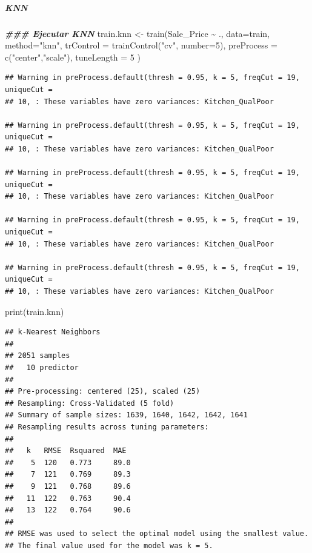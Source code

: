 \documentclass[
]{article}
\newenvironment{Shaded}{\begin{snugshade}}{\end{snugshade}}
\newcommand{\AttributeTok}[1]{\textcolor[rgb]{0.77,0.63,0.00}{#1}}
\newcommand{\DecValTok}[1]{\textcolor[rgb]{0.00,0.00,0.81}{#1}}
\newcommand{\DocumentationTok}[1]{\textcolor[rgb]{0.56,0.35,0.01}{\textbf{\textit{#1}}}}
\newcommand{\FunctionTok}[1]{\textcolor[rgb]{0.00,0.00,0.00}{#1}}
\newcommand{\NormalTok}[1]{#1}
\newcommand{\OtherTok}[1]{\textcolor[rgb]{0.56,0.35,0.01}{#1}}
\newcommand{\SpecialCharTok}[1]{\textcolor[rgb]{0.00,0.00,0.00}{#1}}
\newcommand{\StringTok}[1]{\textcolor[rgb]{0.31,0.60,0.02}{#1}}
\begin{document}
\hypertarget{knn}{%
\subparagraph{KNN}\label{knn}}

\begin{Shaded}
\begin{Highlighting}[]
\DocumentationTok{\#\#\# Ejecutar KNN}
\NormalTok{train.knn }\OtherTok{\textless{}{-}} \FunctionTok{train}\NormalTok{(Sale\_Price }\SpecialCharTok{\textasciitilde{}}\NormalTok{ ., }
                   \AttributeTok{data=}\NormalTok{train, }\AttributeTok{method=}\StringTok{"knn"}\NormalTok{,  }
                   \AttributeTok{trControl =} \FunctionTok{trainControl}\NormalTok{(}\StringTok{"cv"}\NormalTok{, }\AttributeTok{number=}\DecValTok{5}\NormalTok{),}
                   \AttributeTok{preProcess =} \FunctionTok{c}\NormalTok{(}\StringTok{"center"}\NormalTok{,}\StringTok{"scale"}\NormalTok{),}
                   \AttributeTok{tuneLength =} \DecValTok{5} 
\NormalTok{)}
\end{Highlighting}
\end{Shaded}

\begin{verbatim}
## Warning in preProcess.default(thresh = 0.95, k = 5, freqCut = 19, uniqueCut =
## 10, : These variables have zero variances: Kitchen_QualPoor

## Warning in preProcess.default(thresh = 0.95, k = 5, freqCut = 19, uniqueCut =
## 10, : These variables have zero variances: Kitchen_QualPoor

## Warning in preProcess.default(thresh = 0.95, k = 5, freqCut = 19, uniqueCut =
## 10, : These variables have zero variances: Kitchen_QualPoor

## Warning in preProcess.default(thresh = 0.95, k = 5, freqCut = 19, uniqueCut =
## 10, : These variables have zero variances: Kitchen_QualPoor

## Warning in preProcess.default(thresh = 0.95, k = 5, freqCut = 19, uniqueCut =
## 10, : These variables have zero variances: Kitchen_QualPoor
\end{verbatim}

\begin{Shaded}
\begin{Highlighting}[]
\FunctionTok{print}\NormalTok{(train.knn)}
\end{Highlighting}
\end{Shaded}

\begin{verbatim}
## k-Nearest Neighbors 
## 
## 2051 samples
##   10 predictor
## 
## Pre-processing: centered (25), scaled (25) 
## Resampling: Cross-Validated (5 fold) 
## Summary of sample sizes: 1639, 1640, 1642, 1642, 1641 
## Resampling results across tuning parameters:
## 
##   k   RMSE  Rsquared  MAE 
##    5  120   0.773     89.0
##    7  121   0.769     89.3
##    9  121   0.768     89.6
##   11  122   0.763     90.4
##   13  122   0.764     90.6
## 
## RMSE was used to select the optimal model using the smallest value.
## The final value used for the model was k = 5.
\end{verbatim}
\end{document}

